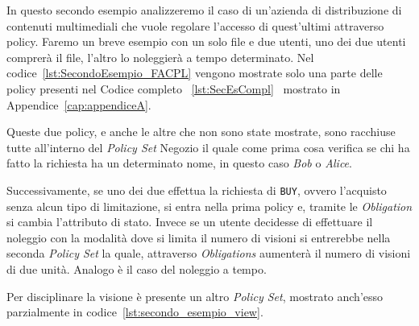 In questo secondo esempio analizzeremo il caso di un'azienda di distribuzione di contenuti multimediali che vuole regolare l'accesso di quest'ultimi attraverso policy.
Faremo un breve esempio con un solo file e due utenti, uno dei due utenti comprerà il file, l'altro lo noleggierà a tempo determinato.
Nel codice~\ref{lst:SecondoEsempio_FACPL} vengono mostrate solo una parte delle policy presenti nel Codice completo ~\ref{lst:SecEsCompl} \ mostrato in Appendice~\ref{cap:appendiceA}.

Queste due policy, e anche le altre che non sono state mostrate, sono racchiuse tutte all'interno del \textit{Policy Set} Negozio il quale come prima cosa verifica se chi ha fatto la richiesta ha un determinato nome, in questo caso \textit{Bob} o \textit{Alice}. \par
Successivamente, se uno dei due effettua la richiesta di \texttt{BUY}, ovvero l'acquisto senza alcun tipo di limitazione, si entra nella prima policy e, tramite le \textit{Obligation} si cambia l'attributo di stato. Invece se un utente decidesse di effettuare il noleggio con la modalità dove si limita il numero di visioni si entrerebbe nella seconda \textit{Policy Set} la quale, attraverso \textit{Obligations} aumenterà il numero di visioni di due unità. Analogo è il caso del noleggio a tempo. \par
Per disciplinare la visione è presente un altro \textit{Policy Set}, mostrato anch'esso parzialmente in codice~\ref{lst:secondo_esempio_view}.

